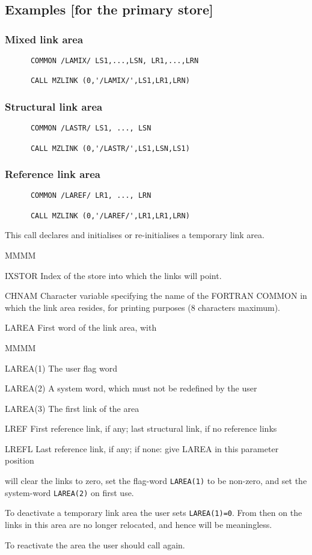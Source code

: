 \subsection{Examples [for the primary store]}
\subsubsection{Mixed link area}
\begin{verbatim}
      COMMON /LAMIX/ LS1,...,LSN, LR1,...,LRN
 
      CALL MZLINK (0,'/LAMIX/',LS1,LR1,LRN)
\end{verbatim}
\subsubsection{Structural link area}
\begin{verbatim}
      COMMON /LASTR/ LS1, ..., LSN
 
      CALL MZLINK (0,'/LASTR/',LS1,LSN,LS1)
\end{verbatim}
\subsubsection{Reference link area}
\begin{verbatim}
      COMMON /LAREF/ LR1, ..., LRN
 
      CALL MZLINK (0,'/LAREF/',LR1,LR1,LRN)
\end{verbatim}
\par This call declares and initialises or re-initialises
a temporary link area.
\Idesc
\begin{DL}{MMMM}
\item[IXSTOR]Index of the store into which the links will point.
\item[CHNAM]Character variable specifying the
name of the FORTRAN COMMON in which the link area resides,
for printing purposes (8 characters maximum).
\item[LAREA]First word of the link area, with
\begin{DL}{MMMM}
\item[LAREA(1)]The user flag word
\item[LAREA(2)]A system word, which must not be redefined by the user
\item[LAREA(3)]The first link of the area
\end{DL}
\item[LREF]First reference link, if any;
last structural link, if no reference links
\item[LREFL]Last reference link, if any;
if none: give LAREA in this parameter position
\end{DL}
\par {} will clear the links to zero,
set the flag-word {\tt LAREA(1)} to be non-zero,
and set the system-word {\tt LAREA(2)} on first use.
\par To deactivate a temporary link area the user sets {\tt LAREA(1)=0}.
From then on the links in this area are no longer relocated,
and hence will be meaningless.
\par To reactivate the area the user should call  again.
